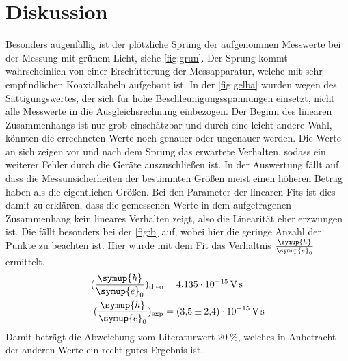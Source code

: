 \section{Diskussion}
\label{sec:Diskussion}
Besonders augenfällig ist der plötzliche Sprung der aufgenommen Messwerte bei der Messung mit grünem Licht, siehe \autoref{fig:grun}.
Der Sprung kommt wahrscheinlich von einer Erschütterung der Messapparatur, welche mit sehr empfindlichen Koaxialkabeln aufgebaut ist.
In der \autoref{fig:gelba} wurden wegen des Sättigungswertes, der sich für hohe Beschleunigungsspannungen einsetzt, nicht alle Messwerte in die Ausgleichsrechnung einbezogen.
Der Beginn des linearen Zusammenhangs ist nur grob einschätzbar und durch eine leicht andere Wahl, könnten die errechneten Werte noch genauer oder ungenauer werden.
Die Werte an sich zeigen vor und nach dem Sprung das erwartete Verhalten, sodass ein weiterer Fehler durch die Geräte auszuschließen ist.
In der Auswertung fällt auf, dass die Messunsicherheiten der bestimmten Größen meist einen höheren Betrag haben als die eigentlichen Größen. 
Bei den Parameter der linearen Fits ist dies damit zu erklären, dass die gemessenen Werte in dem aufgetragenen Zusammenhang kein lineares Verhalten zeigt, also die Linearität eher erzwungen ist.
Die fällt besonders bei der \autoref{fig:b} auf, wobei hier die geringe Anzahl der Punkte zu beachten ist. 
Hier wurde mit dem Fit das Verhältnis $\frac{\symup{h}}{\symup{e}_0}$ ermittelt. 
\begin{align*}
    (\frac{\symup{h}}{\symup{e}_0})_{\text{theo}} &= \SI{4.135e-15}{\volt\second}\\
    (\frac{\symup{h}}{\symup{e}_0})_{\text{exp}} &= \SI{3.5(24)e-15}{\volt\second}
\end{align*} 
Damit beträgt die Abweichung vom Literaturwert $\SI{20}{\percent}$, welches in Anbetracht der anderen Werte ein recht gutes Ergebnis ist.

\newpage
